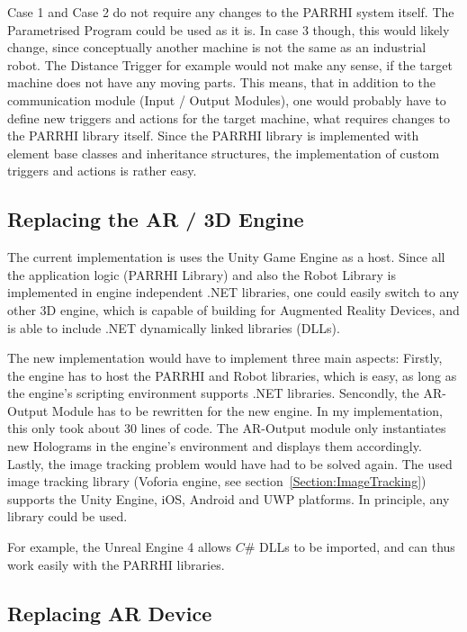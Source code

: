 Case 1 and Case 2 do not require any changes to the PARRHI system itself. The Parametrised Program could be used as it is. In case 3 though, this would likely change, since conceptually another machine is not the same as an industrial robot. The Distance Trigger for example would not make any sense, if the target machine does not have any moving parts. This means, that in addition to the communication module (Input / Output Modules), one would probably have to define new triggers and actions for the target machine, what requires changes to the PARRHI library itself. Since the PARRHI library is implemented with element base classes and inheritance structures, the implementation of custom triggers and actions is rather easy.

\subsection{Replacing the AR / 3D Engine}

The current implementation is uses the Unity Game Engine as a host. Since all the application logic (PARRHI Library) and also the Robot Library is implemented in engine independent .NET libraries, one could easily switch to any other 3D engine, which is capable of building for Augmented Reality Devices, and is able to include .NET dynamically linked libraries (DLLs). 

The new implementation would have to implement three main aspects: Firstly, the engine has to host the PARRHI and Robot libraries, which is easy, as long as the engine's scripting environment supports .NET libraries. Sencondly, the AR-Output Module has to be rewritten for the new engine. In my implementation, this only took about 30 lines of code. The AR-Output module only instantiates new Holograms in the engine's environment and displays them accordingly. Lastly, the image tracking problem would have had to be solved again. The used image tracking library (Voforia engine, see section~\ref{Section:ImageTracking}) supports the Unity Engine, iOS, Android and UWP platforms. In principle, any library could be used.

For example, the Unreal Engine 4 \cite{unrealEngine} allows $C\#$ DLLs to be imported, and can thus work easily with the PARRHI libraries.

\subsection{Replacing AR Device}

